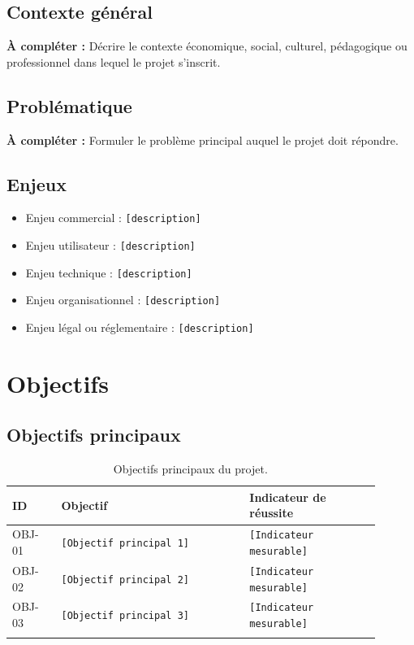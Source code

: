 \documentclass[11pt,a4paper]{report}
\newcommand{\placeholder}[1]{\textcolor{placeholderColor}{\texttt{[#1]}}}
\newcommand{\todo}[1]{\textcolor{todoColor}{\textbf{À compléter :} #1}}
\newcommand{\blankspace}[1]{\vspace*{#1}}
\begin{document}
\section{Contexte général}
\todo{Décrire le contexte économique, social, culturel, pédagogique ou professionnel dans lequel le projet s'inscrit.}
\blankspace{8cm}

\section{Problématique}
\todo{Formuler le problème principal auquel le projet doit répondre.}
\blankspace{6cm}

\section{Enjeux}
\begin{itemize}[leftmargin=*]
  \item Enjeu commercial : \placeholder{description}
  \item Enjeu utilisateur : \placeholder{description}
  \item Enjeu technique : \placeholder{description}
  \item Enjeu organisationnel : \placeholder{description}
  \item Enjeu légal ou réglementaire : \placeholder{description}
\end{itemize}
\blankspace{4cm}

\chapter{Objectifs}

\section{Objectifs principaux}
\begin{longtable}{p{0.12\linewidth}p{0.46\linewidth}p{0.32\linewidth}}
\toprule
\textbf{ID} & \textbf{Objectif} & \textbf{Indicateur de réussite} \\
\midrule
\endhead
OBJ-01 & \placeholder{Objectif principal 1} & \placeholder{Indicateur mesurable} \\
OBJ-02 & \placeholder{Objectif principal 2} & \placeholder{Indicateur mesurable} \\
OBJ-03 & \placeholder{Objectif principal 3} & \placeholder{Indicateur mesurable} \\
\bottomrule
\caption{Objectifs principaux du projet.}
\label{tab:objectifs}
\end{longtable}
\end{document}
